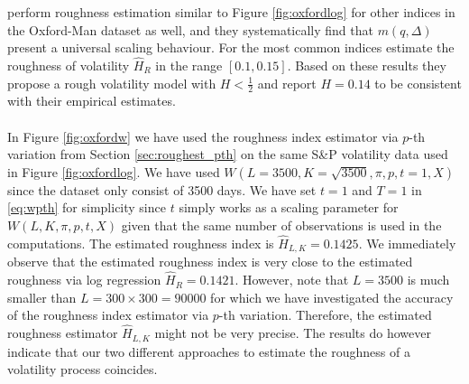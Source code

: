 \documentclass{article}
\begin{document}
\cite{gatheral} perform roughness estimation similar to Figure \ref{fig:oxfordlog} for other indices in the Oxford-Man dataset as well, and they systematically find that $m(q,\Delta)$ present a universal scaling behaviour. For the most common indices \cite{gatheral} estimate the roughness of volatility $\widehat{H}_R$ in the range $[0.1,0.15]$. Based on these results they propose a rough volatility model with $H<\frac{1}{2}$ and \cite{gatheral} report $H=0.14$ to be consistent with their empirical estimates.\\\\
In Figure \ref{fig:oxfordw} we have used the roughness index estimator via $p$-th variation from Section \ref{sec:roughest_pth} on the same S\&P volatility data used in Figure \ref{fig:oxfordlog}. We have used $W(L = 3500, K = \sqrt{3500}, \pi, p, t=1, X)$ since the dataset only consist of 3500 days. We have set $t=1$ and $T=1$ in \eqref{eq:wpth} for simplicity since $t$ simply works as a scaling parameter for $W(L, K, \pi, p, t, X)$ given that the same number of observations is used in the computations. The estimated roughness index is $\widehat{H}_{L,K}=0.1425$. We immediately observe that the estimated roughness index is very close to the estimated roughness via log regression $\widehat{H}_{R}=0.1421$. However, note that $L=3500$ is much smaller than $L=300\times 300 = 90000$ for which we have investigated the accuracy of the roughness index estimator via $p$-th variation. Therefore, the estimated roughness estimator $\widehat{H}_{L,K}$ might not be very precise. The results do however indicate that our two different approaches to estimate the roughness of a volatility process coincides.
\end{document}
